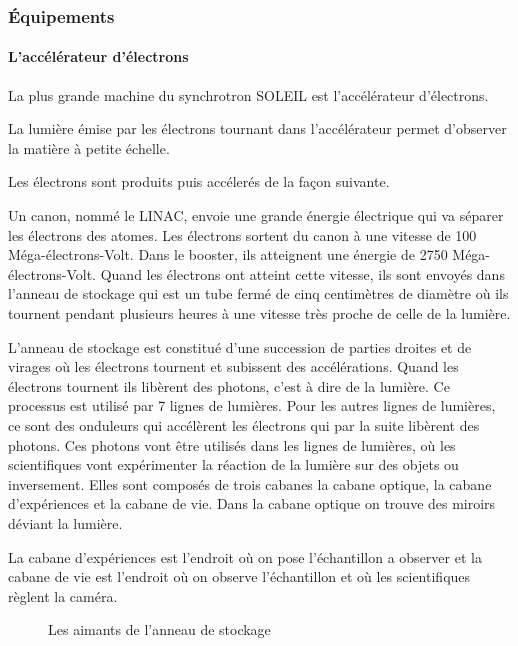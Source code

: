		\subsubsection{Équipements}
			
			\paragraph{L'accélérateur d'électrons}
				La plus grande machine du synchrotron SOLEIL est l'accélérateur d'électrons.
				
				La lumière émise par les électrons tournant dans l'accélérateur permet d'observer la matière à petite échelle.
				
				Les électrons sont produits puis accélerés de la façon suivante.
				
				Un canon, nommé le LINAC, envoie une grande énergie électrique qui va séparer les électrons des atomes. Les électrons sortent du canon à une vitesse de 100 Méga-électrons-Volt.  Dans le booster, ils atteignent une énergie de 2750 Méga-électrons-Volt. Quand les électrons ont atteint cette vitesse, ils sont envoyés dans l'anneau de stockage qui est un tube fermé de cinq centimètres de diamètre où ils tournent pendant plusieurs heures à une vitesse très proche de celle de la lumière. 

				L'anneau de stockage est constitué d'une succession de parties droites et de virages où les électrons tournent et subissent des accélérations. Quand les électrons tournent ils libèrent des photons, c'est à dire de la lumière. Ce processus est utilisé par 7 lignes de lumières. Pour les autres lignes de lumières, ce sont des onduleurs qui accélèrent les électrons qui par la suite libèrent des photons. Ces photons vont être utilisés dans les lignes de lumières, où les scientifiques vont expérimenter la réaction de la lumière sur des objets ou inversement. Elles sont composés de trois cabanes\: la cabane optique, la cabane d'expériences et la cabane de vie. Dans la cabane optique on trouve des miroirs déviant la lumière.

			    La cabane d'expériences est l'endroit où on pose l'échantillon a observer et la cabane de vie est l'endroit où on observe l'échantillon et où les scientifiques règlent la caméra. 
			\begin{figure}
 				 \centering
 				 \caption{Les aimants de l'anneau de stockage}
				\end{figure}

